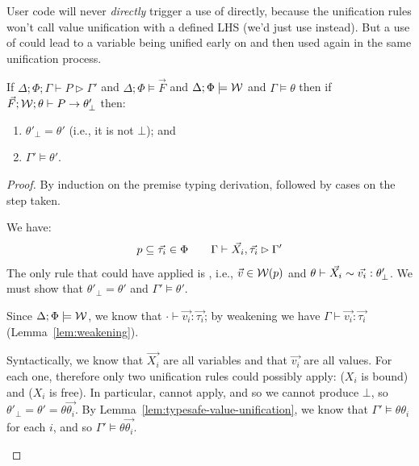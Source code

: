 \documentclass[acmsmall,screen,nonacm]{acmart}
\theoremstyle{definition}
\begin{document}
User code will never \emph{directly} trigger a use
of  directly, because the unification rules won't call
value unification with a defined LHS (we'd just use 
instead). But a use of  could lead to a
variable being unified early on and then used again in the same
unification process.

\begin{lemma}
\label{lem:typesafe-premise}
  If $\Delta; \Phi; \Gamma \vdash P \rhd \Gamma'$ and
  $\Delta; \Phi \models \vec{F}$ and $\Delta; \Phi \models \mathcal{W}$ and
  $\Gamma \models \theta$ then
%
  if $\vec{F}; \mathcal{W}; \theta \vdash P \rightarrow \theta'_\bot$ then:
%
  \begin{enumerate}

  \item\label{typesafety:premise-safe} $\theta'_\bot = \theta'$ (i.e.,
  it is not $\bot$); and

  \item\label{typesafety:premise-pres}
  $\Gamma' \models \theta'$.  
  \end{enumerate}
%
\begin{proof}
  By induction on the premise typing derivation, followed by cases on the step taken.
%
\begin{proofcases}

  \item[(\rn{$P$-PosAtom})] We have:
%
  \[ p \subseteq \vec{\tau_i} \in \Phi \quad\quad
     \Gamma \vdash \vec{X_i}, \vec{\tau_i} \rhd \Gamma'
  \]
%
  The only rule that could have applied is , i.e.,
  $\vec{v} \in \mathcal{W}(p)$ and
  $\theta \vdash \vec{X_i} \sim \vec{v_i} : \theta'_\bot$. We must
  show that $\theta'_\bot = \theta'$ and $\Gamma' \models \theta'$.

  Since $\Delta; \Phi \models \mathcal{W}$, we know that
  $\cdot \vdash \vec{v_i} : \vec{\tau_i}$; by weakening we have
  $\Gamma \vdash \vec{v_i} : \vec{\tau_i}$
  (Lemma~\ref{lem:weakening}).

  Syntactically, we know that $\vec{X_i}$ are all variables and that
  $\vec{v_i}$ are all values. For each one, therefore only two
  unification rules could possibly apply:  ($X_i$ is
  bound) and  ($X_i$ is free). In
  particular,  cannot apply, and so we cannot
  produce $\bot$, so $\theta'_\bot = \theta' = \theta\vec{\theta_i}$.
%
  By Lemma~\ref{lem:typesafe-value-unification}, we know that
  $\Gamma' \models \theta\theta_i$ for each $i$, and so
  $\Gamma' \models \theta\vec{\theta_i}$.


\end{proofcases}
\end{proof}
\end{lemma}
\end{document}
